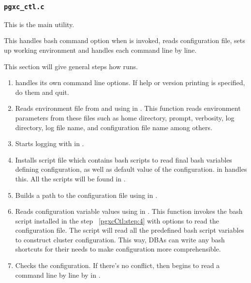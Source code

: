 
\subsubsection{\texttt{pgxc\_ctl.c}}

  This is the main  utility.
  
  This handles bash command option when  is invoked, reads configuration file,
  sets up working environment and handles each command line by line.
  
  This section will give general steps how  runs.
  
  \begin{enumerate}
	  \item {} handles its own command line options.
	  		If help or version printing is specified, do them and quit.
	  \item  Reads environment file from  and  using
			 in .
	  		This function reads environment parameters from these files such as  home
			directory, prompt, verbosity, log directory, log file name, and configuration file name
			among others.
	  \item Starts logging with  in .
	  \item \label{pgxcCtl:step:4}Installs  script file which contains bash scripts to read
	  		final bash variables defining \XC{} configuration, as well as default value of the configuration.
			 in  handles this.
	  		All the scripts will be found in .
	  \item Builds a path to the configuration file using  in .
	  \item Reads configuration variable values using  in .
	  		This function invokes the bash script installed in the step~ \ref{pgxcCtl:step:4} with
			options to read the configuration file.
	  		The script will read all the predefined bash script variables to construct \XC{} cluster
			configuration.
	  		This way, DBAs can write any bash shortcuts for their needs to make configuration more
			comprehensible.
	  \item Checks the configuration.
	  		If there's no conflict, then  begins to read a command line by line by
			 in .
  \end{enumerate}
  
